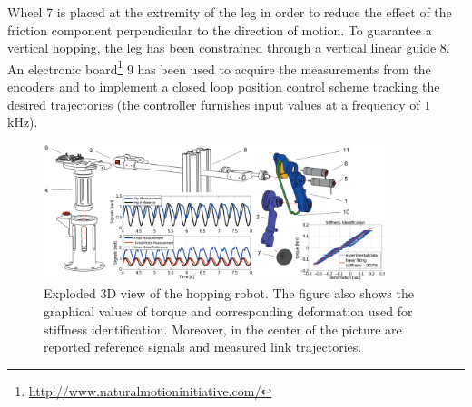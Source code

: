 Wheel 7 is placed at the extremity of the leg in order to reduce the effect of the friction component perpendicular to the direction of motion. To guarantee a vertical hopping, the leg has been constrained through a vertical linear guide 8. An electronic board\footnote{\url{http://www.naturalmotioninitiative.com/}} 9 has been used to acquire the measurements from the encoders and to implement a closed loop position control scheme tracking the desired trajectories (the controller furnishes input values at a frequency of $1$ kHz).
\begin{figure}[!t]
\centering
\includegraphics[width=0.89\textwidth]{dwg/SaltarelloEsploso}
\caption{Exploded 3D view of the hopping robot. The figure also shows the graphical values of torque and corresponding deformation used for stiffness identification. Moreover, in the center of the picture are reported reference signals and measured link trajectories.}
\label{fig:SaltarelloEsploso}
\end{figure}

% 

